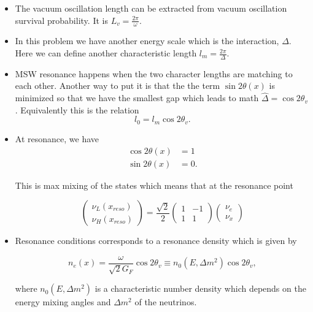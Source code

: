 \documentclass{tufte-handout}
\begin{document}
\begin{itemize}
\item
The vacuum oscillation length can be extracted from vacuum oscillation survival probability. It is $L_v = \frac{2\pi}{\omega}$.
\item
In this problem we have another energy scale which is the interaction, $\Delta$. Here we can define another characteristic length $l_m = \frac{2\pi}{\Delta}$.
\item 
MSW resonance happens when the two character lengths are matching to each other. Another way to put it is that the the term $\sin 2\theta(x)$ is minimized so that we have the smallest gap which leads to math $\hat\Delta = \cos 2\theta_v$. Equivalently this is the relation
\begin{equation*}
l_0 = l_m\cos 2\theta_v.
\end{equation*}
\item
At resonance, we have
\begin{align*}
\cos 2\theta(x) &= 1 \\
\sin 2\theta(x) &= 0.
\end{align*}

This is max mixing of the states which means that at the resonance point

\begin{equation*}
\begin{pmatrix} \nu_L(x_{reso}) \\ \nu_H(x_{reso}) \end{pmatrix} = \frac{\sqrt{2}}{2}\begin{pmatrix} 1 & -1 \\ 1 & 1 \end{pmatrix} \begin{pmatrix}\nu_e \\ \nu_x \end{pmatrix}
\end{equation*}

\item

Resonance conditions corresponds to a resonance density which is given by

\begin{equation*}
n_e(x) = \frac{\omega}{\sqrt{2}G_F } \cos 2\theta_v \equiv n_0(E,\Delta m^2) \cos 2\theta_v,
\end{equation*}

where $n_0(E,\Delta m^2)$ is a characteristic number density which depends on the energy mixing angles and $\Delta m^2$ of the neutrinos.



\end{itemize}
\end{document}
